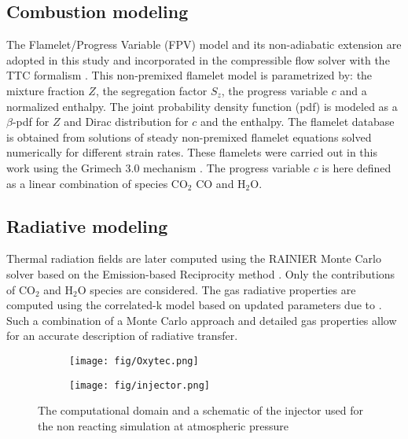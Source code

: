 \documentclass[twocolumn,10pt]{asme2e}
\begin{document}
\subsection*{Combustion modeling}
The Flamelet/Progress Variable (FPV) model \cite{pierce2004progress} and its non-adiabatic extension \cite{ihme2008prediction} are adopted in this study and incorporated in the compressible flow solver with the TTC formalism \cite{vicquelin2011coupling}. This non-premixed flamelet model is parametrized by: the mixture fraction $Z$, the segregation factor $S_z$,  the progress variable $c$ and a normalized enthalpy. The joint probability density function (pdf) is modeled as a $\beta$-pdf for $Z$ and Dirac distribution for $c$ and the enthalpy.
The flamelet database is obtained from solutions of steady non-premixed flamelet equations solved numerically for different strain rates. These flamelets were carried out in this work using the Grimech 3.0 mechanism  \cite{smith1999gri}. The progress variable $c$ is here defined as a linear combination of species CO$_2$ CO and H$_2$O. \\

\subsection*{Radiative modeling}
Thermal radiation fields are later computed using the RAINIER Monte Carlo solver \cite{palluotto2019assessment} based on the Emission-based Reciprocity method \cite{tesse2002radiative}. Only the contributions of CO$_2$ and H$_2$O species are considered. The gas radiative properties are computed using the correlated-k model \cite{goody1989correlated} based on updated parameters due to \cite{riviere2012updated}. Such a combination of a Monte Carlo approach and detailed gas properties allow for an accurate description of radiative transfer. 
 

\begin{figure}
   \centering
   \begin{subfigure}[b]{1.2\linewidth}        %
       \centering
       \texttt{[image: fig/Oxytec.png]}
       \caption{  }
   \end{subfigure}
   \begin{subfigure}[b]{0.8\linewidth}        %
       \centering
       \texttt{[image: fig/injector.png]}
       \caption{ }
   \end{subfigure}
   \caption{The computational domain and a schematic of the injector used for the non reacting simulation at atmospheric pressure}
   \label{fig:domainP1}
\end{figure} 
\end{document}
